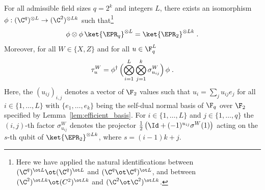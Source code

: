 \begin{lemma}
  \label{lem:pauli-binary}
  For all admissible field sizes $q = 2^k$ and integers $L$, there exists
  an isomorphism $\phi: (\C^q)^{\otimes L} \to (\C^2)^{\otimes L k}$
  such that\footnote{ Here we have applied the natural identifications between
  $(\C^q)^{\ot L} \ot (\C^q)^{\ot L}$ and $(\C^q \ot \C^q)^{\ot L}$,
  and between $(\C^2)^{\ot L k} \ot (C^2)^{\ot Lk}$ and $(\C^2 \ot
  \C^2)^{\ot Lk}$.}
\begin{equation}
    \label{eq:epr-q-to-epr-2}
    \phi \otimes \phi \, \ket{\EPR_q}^{\otimes L} =
    \ket{\EPR_2}^{\otimes L k}\;.
  \end{equation}
  Moreover, for all $W \in \{X,Z\}$ and for all $u \in \F_q^L$
	\begin{equation}
	\label{eq:pauli-q-to-pauli-2}
  	\tau^W_u = \phi^\dagger\, \Bigl (\bigotimes_{i=1}^L
    \bigotimes_{j=1}^{k} \sigma^{W}_{u_{ij}} \Bigr) \, \phi\;.
	\end{equation}
	Here, the $(u_{ij})_{i,j}$ denotes a vector of $\F_2$ values such that $u_i =
  \sum_j u_{ij} e_j$ for all $i \in \{1,\ldots,L\}$ with
  $\{e_1,\ldots,e_{k}\}$ being the self-dual normal basis of $\F_q$ over $\F_2$
  specified by Lemma~\ref{lem:efficient_basis}.
  For $i\in\{1,\ldots,L\}$ and $j\in\{1,\ldots,q\}$ the $(i,j)$-th factor
  $\sigma^{W}_{u_{ij}}$ denotes the projector $\frac{1}{2} \left ( \Id +
    (-1)^{u_{ij}} \sigma^W(1) \right)$ acting on the $s$-th qubit of
  $\ket{\EPR_2}^{\otimes L k}$, where $s = (i-1) k + j$.
\end{lemma}

